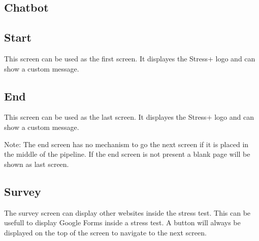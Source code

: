 \subsection{Chatbot}
\label{sec:screens-chatbot}

\subsection{Start}
\label{sec:screens-start}

This screen can be used as the first screen.
It displayes the Stress+ logo and can show a custom message.

\subsection{End}
\label{sec:screens-end}

This screen can be used as the last screen.
It displayes the Stress+ logo and can show a custom message.

Note: The end screen has no mechanism to go the next screen if it is placed in the middle of the pipeline.
If the end screen is not present a blank page will be shown as last screen.

\subsection{Survey}
\label{sec:screens-survey}

The survey screen can display other websites inside the stress test. 
This can be usefull to display Google Forms inside a stress test.
A button will always be displayed on the top of the screen to navigate to the next screen.
